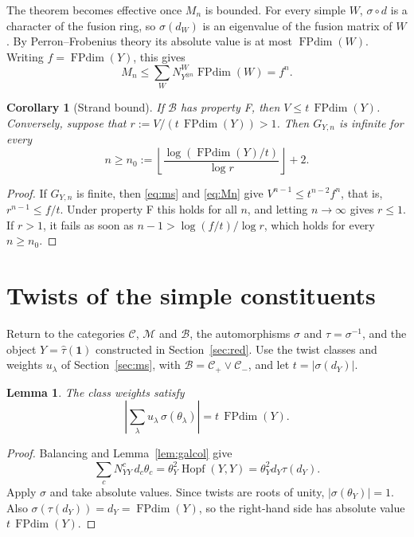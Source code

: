 \documentclass[11pt,oneside]{amsart}
\newtheorem{lemma}[theorem]{Lemma}
\newtheorem{corollary}[theorem]{Corollary}
\theoremstyle{remark}
\newcommand{\C}{\mathcal C}
\newcommand{\M}{\mathcal M}
\newcommand{\one}{\mathbf 1}
\newcommand{\FP}{\operatorname{FPdim}}
\newcommand{\Hopf}{\operatorname{Hopf}}
\newcommand{\htau}{\hat\tau}
\begin{document}
The theorem becomes effective once $M_n$ is bounded. For every simple $W$,
$\sigma\circ d$ is a character of the fusion ring, so $\sigma(d_W)$ is an
eigenvalue of the fusion matrix of $W$. By Perron--Frobenius theory its absolute
value is at most $\FP(W)$. Writing $f=\FP(Y)$, this gives
\begin{equation}\label{eq:Mn}
M_n\le\sum_WN^W_{Y^{\otimes n}}\FP(W)=f^n.
\end{equation}

\begin{corollary}[Strand bound]\label{cor:strands}
If $\mathcal B$ has property F, then $V\le t\,\FP(Y)$. Conversely, suppose
that $r:=V/(t\,\FP(Y))>1$. Then $G_{Y,n}$ is infinite for every
\[
n\ge n_0:=\left\lfloor\frac{\log(\FP(Y)/t)}{\log r}\right\rfloor+2.
\]
\end{corollary}

\begin{proof}
If $G_{Y,n}$ is finite, then \eqref{eq:ms} and \eqref{eq:Mn} give
$V^{n-1}\le t^{n-2}f^n$, that is, $r^{n-1}\le f/t$. Under property F this holds
for all $n$, and letting $n\to\infty$ gives $r\le1$. If $r>1$, it fails as soon
as $n-1>\log(f/t)/\log r$, which holds for every $n\ge n_0$.
\end{proof}

\section{Twists of the simple constituents}\label{sec:align}

Return to the categories $\C$, $\M$ and $\mathcal B$, the automorphisms $\sigma$ and
$\tau=\sigma^{-1}$, and the object $Y=\htau(\one)$ constructed in
Section~\ref{sec:red}. Use the twist classes and weights $u_\lambda$ of
Section~\ref{sec:ms}, with $\mathcal B=\C_+\vee\C_-$, and let
$t=|\sigma(d_Y)|$.

\begin{lemma}\label{lem:bal}
The class weights satisfy
\[
\left|\sum_\lambda u_\lambda\,\sigma(\theta_\lambda)\right|
=t\,\FP(Y).
\]
\end{lemma}

\begin{proof}
Balancing and Lemma~\ref{lem:galcol} give
\[
\sum_cN_{YY}^c\,d_c\theta_c
=\theta_Y^2\Hopf(Y,Y)
=\theta_Y^2d_Y\tau(d_Y).
\]
Apply $\sigma$ and take absolute values. Since twists are roots of unity,
$|\sigma(\theta_Y)|=1$. Also
$\sigma(\tau(d_Y))=d_Y=\FP(Y)$, so the right-hand side has absolute value
$t\,\FP(Y)$.
\end{proof}
\end{document}

